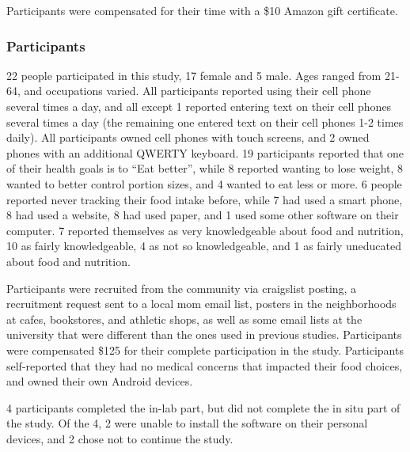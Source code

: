 Participants were compensated for their time with a \$10 Amazon gift certificate.

\subsubsection{Participants}

22 people participated in this study, 17 female and 5 male. Ages ranged from 21-64, and occupations varied. All participants reported using their cell phone several times a day, and all except 1 reported entering text on their cell phones several times a day (the remaining one entered text on their cell phones 1-2 times daily). All participants owned cell phones with touch screens, and 2 owned phones with an additional QWERTY keyboard. 19 participants reported that one of their health goals is to ``Eat better'', while 8 reported wanting to lose weight, 8 wanted to better control portion sizes, and 4 wanted to eat less or more. 6 people reported never tracking their food intake before, while 7 had used a smart phone, 8 had used a website, 8 had used paper, and 1 used some other software on their computer. 7 reported themselves as very knowledgeable about food and nutrition, 10 as fairly knowledgeable, 4 as not so knowledgeable, and 1 as fairly uneducated about food and nutrition.  

Participants were recruited from the community via craigslist posting, a recruitment request sent to a local mom email list, posters in the neighborhoods at cafes, bookstores, and athletic shops, as well as some email lists at the university that were different than the ones used in previous studies. Participants were compensated \$125 for their complete participation in the study. Participants self-reported that they had no medical concerns that impacted their food choices, and owned their own Android devices. 

4 participants completed the in-lab part, but did not complete the in situ part of the study. Of the 4, 2 were unable to install the software on their personal devices, and 2 chose not to continue the study. 

